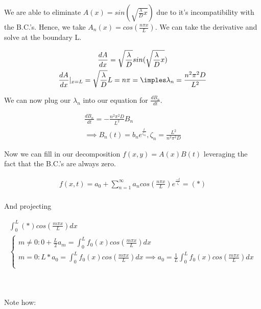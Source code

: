 {        We are able to eliminate $A(x) = sin(\sqrt{\frac{\lambda}{D}x})$ due to it's incompatibility with the B.C.'s. Hence, we take $A_n(x) = cos(\frac{n\pi x}{L})$. We can take the derivative and solve at the boundary L.

        \begin{gather*}
        \frac{dA}{dx} = \sqrt{\frac{\lambda}{D}}sin(\sqrt{\frac{\lambda}{D}x}) \\
        \frac{dA}{dx}|_{x=L} = \sqrt{\frac{\lambda}{D}}L = n\pi = \imples \lambda _n = \frac{n^2\pi^2D}{L^2}\\
        \end{gather*}

        We can now plug our $\lambda_n$ into our equation for $\frac{dB_n}{dt}$.

        \begin{gather*}
            \frac{dB_n}{dt} = - \frac{n^2\pi^2D}{L^2}B_n \\ 
            \implies B_n(t) = b_ne^{\frac{t}{\zeta_n}}, \zeta_n = \frac{L^2}{n^2\pi^2D} 
        \end{gather*}

        Now we can fill in our decomposition $f(x,y) = A(x)B(t)$ leveraging the fact that the B.C.'s are always zero.

        \begin{gather*}
            f(x,t) = a_0  + \sum_{n=1}^{\infty}a_ncos(\frac{n\pi x}{L})e^{\frac{-t}{\zeta}} = {(*)} \\
        \end{gather*}

        And projecting

        \begin{gather*}
            \int_{0}^{L}(*)cos(\frac{m\pi x}{L})dx \\
            \begin{cases}
                m \neq 0: 0 + \frac{L}{2}a_m = \int_{0}^{L}f_0(x)cos(\frac{m\pi x}{L})dx \\
                m = 0: L*a_0 = \int_{0}^{L}f_0(x)cos(\frac{m\pi x}{L})dx \implies a_0 = \frac{1}{L}\int_{0}^{L}f_0(x)cos(\frac{m\pi x}{L})dx \\ 
            \end{cases}
        \end{gather*}


}
\\
\\
Note how: 

